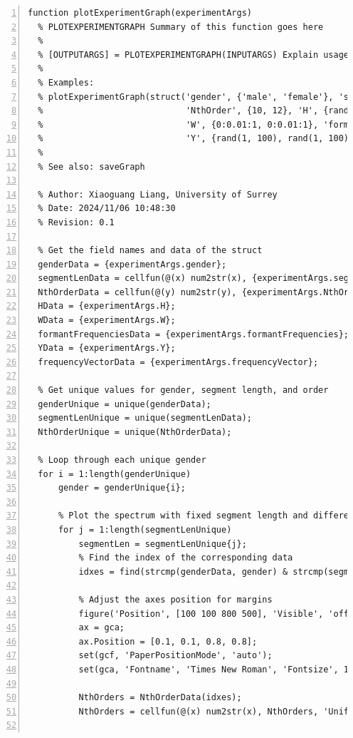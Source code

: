 \documentclass{article}
\begin{document}
\begin{lstlisting}[frame=single, numbers=left, style=Matlab-editor, caption={plotExperimentGraph.m}, label={lst:plotExperimentGraph}]
  function plotExperimentGraph(experimentArgs)
  % PLOTEXPERIMENTGRAPH Summary of this function goes here
  %
  % [OUTPUTARGS] = PLOTEXPERIMENTGRAPH(INPUTARGS) Explain usage here
  %
  % Examples:
  % plotExperimentGraph(struct('gender', {'male', 'female'}, 'segmentLen', {0.02, 0.03}, ...
  %                            'NthOrder', {10, 12}, 'H', {rand(1, 100), rand(1, 100)}, ...
  %                            'W', {0:0.01:1, 0:0.01:1}, 'formantFrequencies', {rand(1, 3), rand(1, 3)}, ...
  %                            'Y', {rand(1, 100), rand(1, 100)}, 'frequencyVector', {0:0.01:1, 0:0.01:1}));
  %
  % See also: saveGraph
  
  % Author: Xiaoguang Liang, University of Surrey
  % Date: 2024/11/06 10:48:30
  % Revision: 0.1
  
  % Get the field names and data of the struct
  genderData = {experimentArgs.gender};
  segmentLenData = cellfun(@(x) num2str(x), {experimentArgs.segmentLen}, 'UniformOutput',0);
  NthOrderData = cellfun(@(y) num2str(y), {experimentArgs.NthOrder}, 'UniformOutput',0);
  HData = {experimentArgs.H};
  WData = {experimentArgs.W};
  formantFrequenciesData = {experimentArgs.formantFrequencies};
  YData = {experimentArgs.Y};
  frequencyVectorData = {experimentArgs.frequencyVector};
  
  % Get unique values for gender, segment length, and order
  genderUnique = unique(genderData);
  segmentLenUnique = unique(segmentLenData);
  NthOrderUnique = unique(NthOrderData);
  
  % Loop through each unique gender
  for i = 1:length(genderUnique)
      gender = genderUnique{i};
  
      % Plot the spectrum with fixed segment length and different orders
      for j = 1:length(segmentLenUnique)
          segmentLen = segmentLenUnique{j};
          % Find the index of the corresponding data
          idxes = find(strcmp(genderData, gender) & strcmp(segmentLenData, segmentLen));
  
          % Adjust the axes position for margins
          figure('Position', [100 100 800 500], 'Visible', 'off');
          ax = gca;
          ax.Position = [0.1, 0.1, 0.8, 0.8];
          set(gcf, 'PaperPositionMode', 'auto');
          set(gca, 'Fontname', 'Times New Roman', 'Fontsize', 10);
  
          NthOrders = NthOrderData(idxes);
          NthOrders = cellfun(@(x) num2str(x), NthOrders, 'UniformOutput',0);
  

\end{lstlisting}
\end{document}
